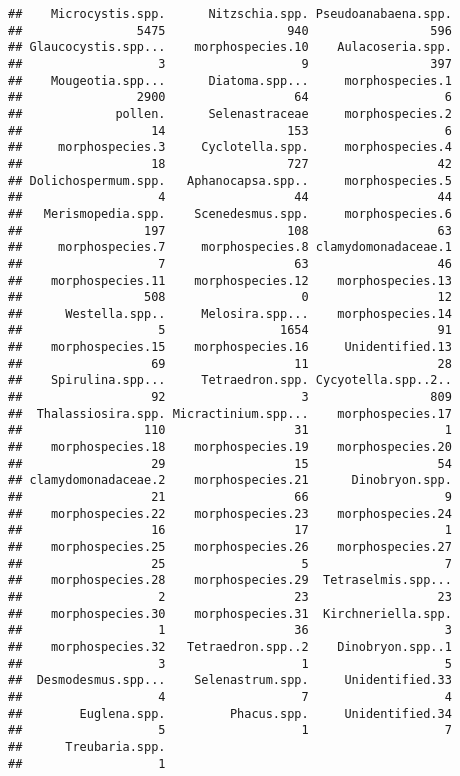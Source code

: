 \documentclass[]{article}
\begin{document}
\begin{verbatim}
##    Microcystis.spp.      Nitzschia.spp. Pseudoanabaena.spp. 
##                5475                 940                 596 
## Glaucocystis.spp...    morphospecies.10    Aulacoseria.spp. 
##                   3                   9                 397 
##    Mougeotia.spp...      Diatoma.spp...     morphospecies.1 
##                2900                  64                   6 
##             pollen.      Selenastraceae     morphospecies.2 
##                  14                 153                   6 
##     morphospecies.3     Cyclotella.spp.     morphospecies.4 
##                  18                 727                  42 
## Dolichospermum.spp.   Aphanocapsa.spp..     morphospecies.5 
##                   4                  44                  44 
##   Merismopedia.spp.    Scenedesmus.spp.     morphospecies.6 
##                 197                 108                  63 
##     morphospecies.7     morphospecies.8 clamydomonadaceae.1 
##                   7                  63                  46 
##    morphospecies.11    morphospecies.12    morphospecies.13 
##                 508                   0                  12 
##      Westella.spp..     Melosira.spp...    morphospecies.14 
##                   5                1654                  91 
##    morphospecies.15    morphospecies.16     Unidentified.13 
##                  69                  11                  28 
##    Spirulina.spp...     Tetraedron.spp. Cycyotella.spp..2.. 
##                  92                   3                 809 
##  Thalassiosira.spp. Micractinium.spp...    morphospecies.17 
##                 110                  31                   1 
##    morphospecies.18    morphospecies.19    morphospecies.20 
##                  29                  15                  54 
## clamydomonadaceae.2    morphospecies.21      Dinobryon.spp. 
##                  21                  66                   9 
##    morphospecies.22    morphospecies.23    morphospecies.24 
##                  16                  17                   1 
##    morphospecies.25    morphospecies.26    morphospecies.27 
##                  25                   5                   7 
##    morphospecies.28    morphospecies.29  Tetraselmis.spp... 
##                   2                  23                  23 
##    morphospecies.30    morphospecies.31  Kirchneriella.spp. 
##                   1                  36                   3 
##    morphospecies.32   Tetraedron.spp..2    Dinobryon.spp..1 
##                   3                   1                   5 
##  Desmodesmus.spp...    Selenastrum.spp.     Unidentified.33 
##                   4                   7                   4 
##        Euglena.spp.         Phacus.spp.     Unidentified.34 
##                   5                   1                   7 
##      Treubaria.spp. 
##                   1
\end{verbatim}
\end{document}
